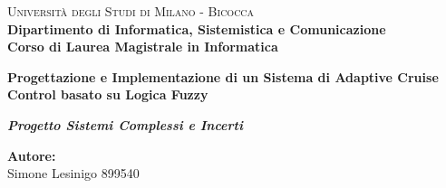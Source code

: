 \begin{titlepage}
    
    \noindent
    \begin{minipage}[t]{0.19\textwidth}
    \end{minipage}
    \hspace{2mm}
    \vspace{3cm}
    \begin{minipage}[t]{0.95\textwidth}
    {
            {\textsc{Università degli Studi di Milano - Bicocca}} \\
            \textbf{Dipartimento di Informatica, Sistemistica e Comunicazione} \\
            \textbf{Corso di Laurea Magistrale in Informatica} \\
            \par
    }
    \end{minipage}
    
\vspace{16mm}

\begin{center}
    \Huge{
        \textbf{Progettazione e Implementazione di un Sistema di Adaptive Cruise Control basato su Logica Fuzzy}                           
    }

    \vspace{12mm}
    
    \LARGE{
        \textbf{
            \textit{Progetto Sistemi Complessi e Incerti}
        }
    }
\end{center}
 
    \vspace{30mm}

    \noindent
    
    \vspace{10mm}

    \begin{flushright}
        {\large \textbf{Autore:}} \\
        \large{Simone Lesinigo 899540} 
    \end{flushright}

    
\end{titlepage}
